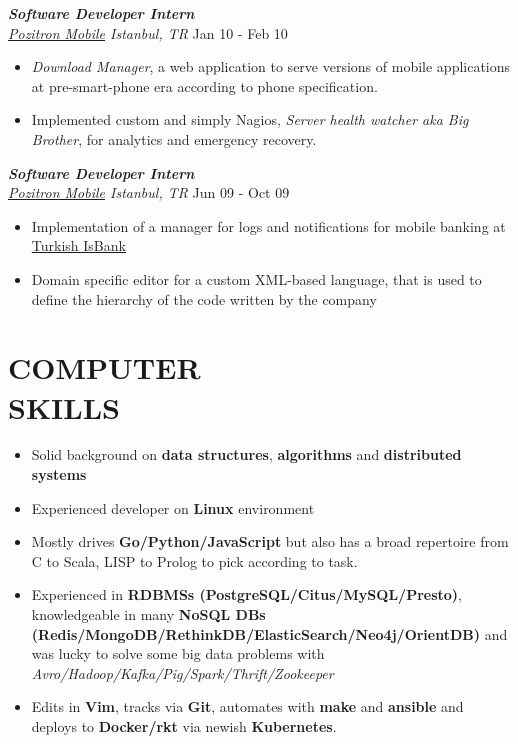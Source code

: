 \documentclass[line, margin]{res}
\begin{document}
\begin{resume}
{\sl \textbf{Software Developer Intern} \\ \href{http://www.pozitron.com/}{Pozitron Mobile} Istanbul, TR} \hfill Jan 10 - Feb 10 \\
\vspace{-0.3cm}
\begin{itemize} \itemsep -2pt
  \item \textit{Download Manager}, a web application to serve versions of mobile applications at pre-smart-phone era according to phone specification.
  \item Implemented custom and simply Nagios, \textit{Server health watcher aka Big Brother}, for analytics and emergency recovery.
\end{itemize}

{\sl \textbf{Software Developer Intern} \\ \href{http://www.pozitron.com/}{Pozitron Mobile} Istanbul, TR} \hfill Jun 09 - Oct 09\\
\vspace{-0.3cm}
\begin{itemize} \itemsep -2pt
  \item Implementation of a manager for logs and notifications for mobile banking at \href{http://www.isbank.com.tr/English/}{Turkish IsBank}
  \item Domain specific editor for a custom XML-based language, that is used to define the hierarchy of the code written by the company
\end{itemize}

\section{COMPUTER \\ SKILLS}
\begin{itemize}
  \item Solid background on \textbf{data structures}, \textbf{algorithms} and \textbf{distributed systems}
  \item Experienced developer on \textbf{Linux} environment
  \item Mostly drives \textbf{Go/Python/JavaScript} but also has a broad repertoire from C to Scala, LISP to Prolog to pick according to task.
  \item Experienced in \textbf{RDBMSs (PostgreSQL/Citus/MySQL/Presto)}, knowledgeable in many \textbf{NoSQL DBs (Redis/MongoDB/RethinkDB/ElasticSearch/Neo4j/OrientDB)} and was lucky to solve some big data problems with \textit{Avro/Hadoop/Kafka/Pig/Spark/Thrift/Zookeeper}
  \item Edits in \textbf{Vim}, tracks via \textbf{Git}, automates with \textbf{make} and \textbf{ansible} and deploys to \textbf{Docker/rkt} via newish \textbf{Kubernetes}.
\end{itemize}


\end{resume}
\end{document}
